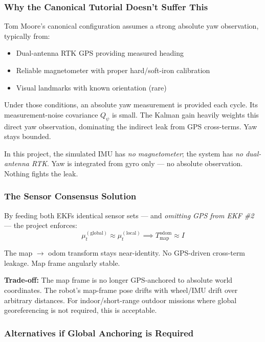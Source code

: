 \documentclass[11pt,a4paper]{article}
\begin{document}
\subsubsection{Why the Canonical Tutorial Doesn't Suffer This}

Tom Moore's canonical configuration assumes a strong absolute yaw observation, typically from:
\begin{itemize}
\item Dual-antenna RTK GPS providing measured heading
\item Reliable magnetometer with proper hard/soft-iron calibration
\item Visual landmarks with known orientation (rare)
\end{itemize}

Under those conditions, an absolute yaw measurement is provided each cycle. Its measurement-noise covariance $Q_\psi$ is small. The Kalman gain heavily weights this direct yaw observation, dominating the indirect leak from GPS cross-terms. Yaw stays bounded.

In this project, the simulated IMU has \emph{no magnetometer}; the system has \emph{no dual-antenna RTK}. Yaw is integrated from gyro only --- no absolute observation. Nothing fights the leak.

\subsubsection{The Sensor Consensus Solution}

By feeding both EKFs identical sensor sets --- and \emph{omitting GPS from EKF \#2} --- the project enforces:
\begin{equation}
\mu_t^{(\text{global})} \approx \mu_t^{(\text{local})} \implies T_{\text{map}}^{\text{odom}} \approx I
\end{equation}

The map $\to$ odom transform stays near-identity. No GPS-driven cross-term leakage. Map frame angularly stable.

\textbf{Trade-off:} The map frame is no longer GPS-anchored to absolute world coordinates. The robot's map-frame pose drifts with wheel/IMU drift over arbitrary distances. For indoor/short-range outdoor missions where global georeferencing is not required, this is acceptable.

\subsubsection{Alternatives if Global Anchoring is Required}
\end{document}
